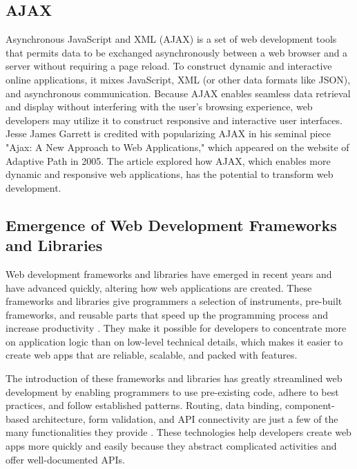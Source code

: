 \subsection{AJAX}
\par Asynchronous JavaScript and XML (AJAX) is a set of web development tools that permits data to be exchanged asynchronously between a web browser and a server without requiring a page reload. To construct dynamic and interactive online applications, it mixes JavaScript, XML (or other data formats like JSON), and asynchronous communication. Because AJAX enables seamless data retrieval and display without interfering with the user's browsing experience, web developers may utilize it to construct responsive and interactive user interfaces. Jesse James Garrett is credited with popularizing AJAX in his seminal piece "Ajax: A New Approach to Web Applications," which appeared on the website of Adaptive Path in 2005. The article explored how AJAX, which enables more dynamic and responsive web applications, has the potential to transform web development. \cite{ajax}

\subsection{Emergence of Web Development Frameworks and Libraries}
\par Web development frameworks and libraries have emerged in recent years and have advanced quickly, altering how web applications are created. These frameworks and libraries give programmers a selection of instruments, pre-built frameworks, and reusable parts that speed up the programming process and increase productivity \cite{Seshadri2014}. They make it possible for developers to concentrate more on application logic than on low-level technical details, which makes it easier to create web apps that are reliable, scalable, and packed with features.

\par The introduction of these frameworks and libraries has greatly streamlined web development by enabling programmers to use pre-existing code, adhere to best practices, and follow established patterns. Routing, data binding, component-based architecture, form validation, and API connectivity are just a few of the many functionalities they provide \cite{Stefanov2021}. These technologies help developers create web apps more quickly and easily because they abstract complicated activities and offer well-documented APIs.

